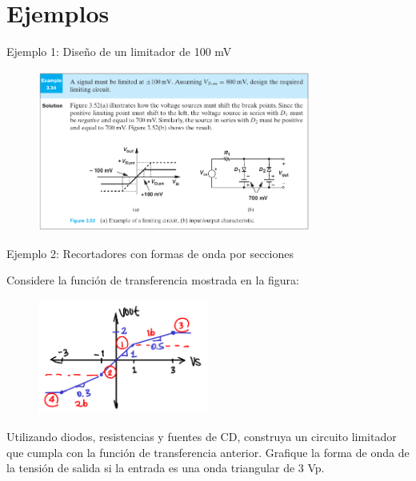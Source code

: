 \documentclass[t,aspectratio=169]{beamer}
\begin{document}
\section{Ejemplos}
\begin{frame}{Ejemplo 1: Diseño de un limitador de 100 mV}

\begin{figure}
    \centering
    \includegraphics[width=0.8\textwidth]{figures/recortador_ejemplo_1.png}
\end{figure}

\end{frame}


\begin{frame}{Ejemplo 2: Recortadores con formas de onda por secciones}

Considere la función de transferencia mostrada en la figura:

\begin{figure}
    \centering
    \includegraphics[width=0.5\textwidth]{figures/recortador_ejemplo_2.png}
\end{figure}

Utilizando diodos, resistencias y fuentes de CD, construya un circuito limitador que cumpla con la función de transferencia anterior. Grafique la forma de onda de la tensión de salida si la entrada es una onda triangular de 3 Vp.

\end{frame}
\end{document}
